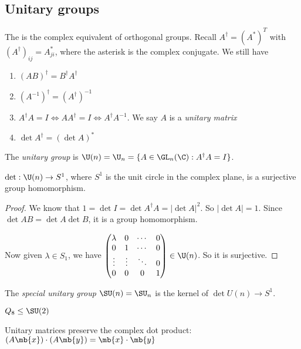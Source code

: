 \documentclass[a4pape]{article}
\begin{document}
\subsection{Unitary groups}
The is the complex equivalent of orthogonal groups. Recall $A^\dagger = (A^*)^T$ with $(A^\dagger)_{ij} = A_{ji}^*$, where the asterisk is the complex conjugate. We still have
\begin{enumerate}
\item $(AB)^\dagger = B^\dagger A^\dagger$
\item $(A^{-1})^\dagger = (A^\dagger)^{-1}$
\item $A^\dagger A = I \Leftrightarrow AA^\dagger = I \Leftrightarrow A^\dagger A^{-1}$. We say $A$ is a \emph{unitary matrix}
\item $\det A^{\dagger} = (\det A)^*$
\end{enumerate}

\begin{defi}
  The \emph{unitary group} is $\U(n) = \U_n = \{A\in \GL_n(\C): A^\dagger A = I\}$.
\end{defi}

\begin{lemma}
  $\det: \U(n)\to S^1$, where $S^1$ is the unit circle in the complex plane, is a surjective group homomorphism.
\end{lemma}

\begin{proof}
  We know that $1 = \det I = \det A^\dagger A = |\det A|^2$. So $|\det A| = 1$. Since $\det AB = \det A\det B$, it is a group homomorphism.

  Now given $\lambda\in S_1$, we have 
  $\begin{pmatrix}
    \lambda & 0 & \cdots & 0\\
    0 & 1 & \cdots & 0\\
    \vdots & \vdots & \ddots & 0\\
    0 & 0 & 0 & 1
  \end{pmatrix}\in \U(n)$. So it is surjective.
\end{proof}

\begin{defi}
  The \emph{special unitary group} $\SU(n) = \SU_n$ is the kernel of $\det U(n)\to S^1$.
\end{defi}
\note $Q_8 \leq \SU(2)$

Unitary matrices preserve the complex dot product: $(A\mb{x})\cdot (A\mb{y}) = \mb{x}\cdot \mb{y}$
\end{document}
